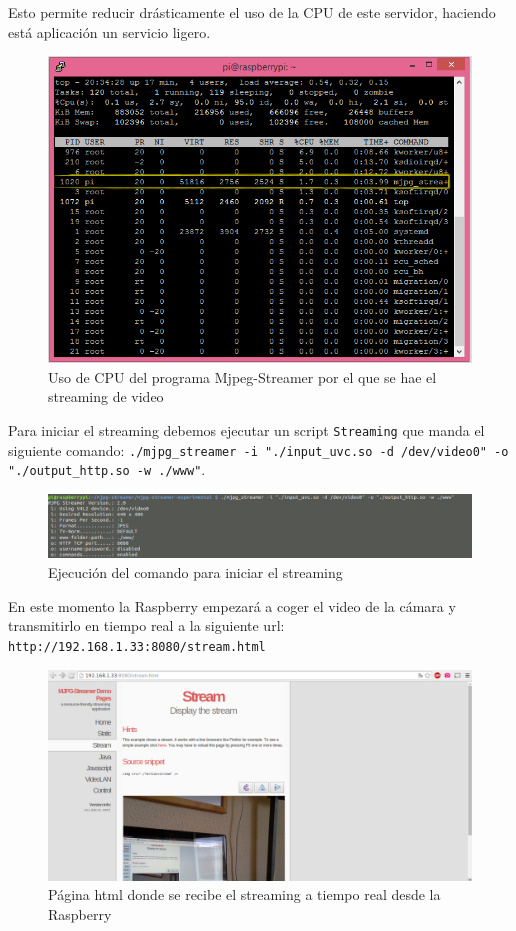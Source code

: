 \documentclass[twoside, 12pt]{epstfg}
\begin{document}
Esto permite reducir drásticamente el uso de la CPU de este servidor, haciendo está aplicación un servicio ligero.


\begin{figure}[h!]
	\centerline{
		\mbox{\includegraphics[width=.80\textwidth]{images/UsoCPUMjpeg.png}}
	}
	\caption{Uso de CPU del programa Mjpeg-Streamer por el que se hae el streaming de video}
\end{figure}


Para iniciar el streaming debemos ejecutar un script \texttt{Streaming} que manda el siguiente comando: \texttt{./mjpg\_streamer -i "./input\_uvc.so -d /dev/video0" -o "./output\_http.so -w ./www"}.



\begin{figure}[h!]
	\centerline{
		\mbox{\includegraphics[width=.80\textwidth]{images/Streamingcomando.png}}
	}
	\caption{Ejecución del comando para iniciar el streaming}
\end{figure}

En este momento la Raspberry empezará a coger el video de la cámara y transmitirlo en tiempo real a la siguiente url: \texttt{http://192.168.1.33:8080/stream.html}

\begin{figure}[h!]
	\centerline{
		\mbox{\includegraphics[width=.80\textwidth]{images/pagStream.png}}
	}
	\caption{Página html donde se recibe el streaming a tiempo real desde la Raspberry }
\end{figure}
\end{document}
